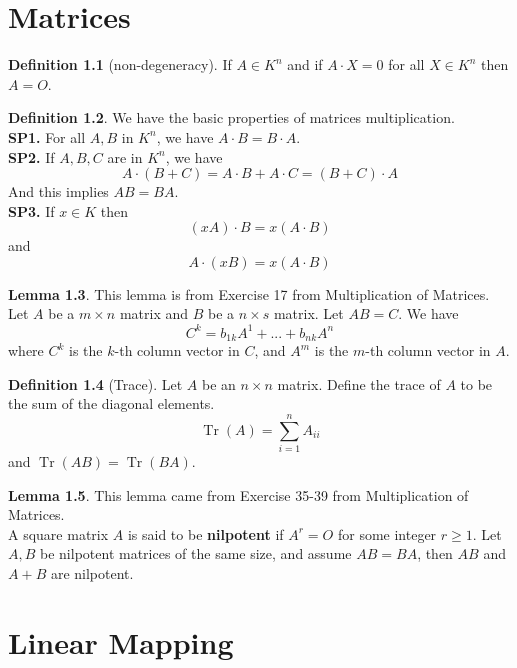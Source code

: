 \documentclass{book}
\DeclareMathOperator{\Tr}{Tr}
\theoremstyle{definition}
\newtheorem{definition}{Definition}[section]
\newtheorem{lemma}[definition]{Lemma}
\begin{document}
\chapter{Matrices}
\begin{definition}[non-degeneracy]
    If $A \in K^n$ and if $A \cdot X = 0$ for all $X \in K^n$ then $A = O$.
\end{definition}
\begin{definition}
    We have the basic properties of matrices multiplication.
    \\ \textbf{SP1.} For all $A, B$ in $K^n$, we have $A \cdot B = B \cdot A$.
    \\ \textbf{SP2.} If $A,B,C$ are in $K^n$, we have 
    \begin{equation*}
        A \cdot (B+C) = A \cdot B + A \cdot C = (B + C) \cdot A
    \end{equation*}
    And this implies $AB=BA$.
    \\ \textbf{SP3.} If $x \in K$ then
    \begin{equation*}
        (xA)\cdot B = x(A \cdot B )
    \end{equation*}
    and
    \begin{equation*}
        A\cdot (xB) = x(A \cdot B)
    \end{equation*}
\end{definition}
\begin{lemma} This lemma is from Exercise 17 from Multiplication of Matrices.
\\ Let $A$ be a $m \times n $ matrix and $B$ be a $n \times s$ matrix. Let $AB=C$. We have 
\begin{equation*}
    C^k = b_{1k}A^1 + ... + b_{nk}A^n
\end{equation*}
where $C^k$ is the $k$-th column vector in $C$, and $A^m$ is the $m$-th column vector in $A$.
\end{lemma}
\begin{definition}[Trace]
    Let $A$ be an $n \times n$ matrix. Define the trace of $A$ to be the sum of the diagonal elements.
    \begin{equation*}
        \Tr(A) = \sum_{i=1}^n A_{ii}
    \end{equation*}
    and $\Tr(AB) = \Tr(BA)$.
\end{definition}
\begin{lemma} This lemma came from Exercise 35-39 from Multiplication of Matrices.
\\ A square matrix $A$ is said to be \textbf{nilpotent} if $A^r = O$ for some integer $r \geq 1$. Let $A,B$ be nilpotent matrices of the same size, and assume $AB=BA$, then $AB$ and $A+B$ are nilpotent.
\end{lemma}
\chapter{Linear Mapping}

% 
\end{document}
